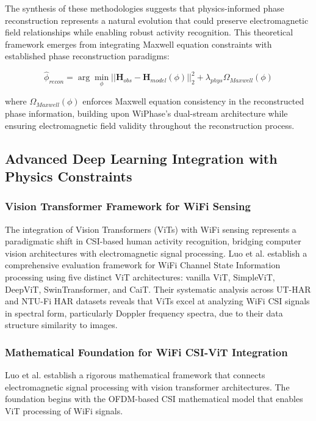 \documentclass[journal]{IEEEtran}
\begin{document}
The synthesis of these methodologies suggests that physics-informed phase reconstruction represents a natural evolution that could preserve electromagnetic field relationships while enabling robust activity recognition. This theoretical framework emerges from integrating Maxwell equation constraints with established phase reconstruction paradigms:

\begin{equation}
\hat{\phi}_{recon} = \arg\min_{\phi} ||\mathbf{H}_{obs} - \mathbf{H}_{model}(\phi)||_2^2 + \lambda_{phys} \Omega_{Maxwell}(\phi)
\label{eq:phase_reconstruction}
\end{equation}

where $\Omega_{Maxwell}(\phi)$ enforces Maxwell equation consistency in the reconstructed phase information, building upon WiPhase's dual-stream architecture while ensuring electromagnetic field validity throughout the reconstruction process.

\subsection{Advanced Deep Learning Integration with Physics Constraints}

\subsubsection{Vision Transformer Framework for WiFi Sensing}

The integration of Vision Transformers (ViTs) with WiFi sensing represents a paradigmatic shift in CSI-based human activity recognition, bridging computer vision architectures with electromagnetic signal processing. Luo et al. \cite{luo2024vision} establish a comprehensive evaluation framework for WiFi Channel State Information processing using five distinct ViT architectures: vanilla ViT, SimpleViT, DeepViT, SwinTransformer, and CaiT. Their systematic analysis across UT-HAR and NTU-Fi HAR datasets reveals that ViTs excel at analyzing WiFi CSI signals in spectral form, particularly Doppler frequency spectra, due to their data structure similarity to images.

\subsubsection{Mathematical Foundation for WiFi CSI-ViT Integration}

Luo et al. \cite{luo2024vision} establish a rigorous mathematical framework that connects electromagnetic signal processing with vision transformer architectures. The foundation begins with the OFDM-based CSI mathematical model that enables ViT processing of WiFi signals.
\end{document}
